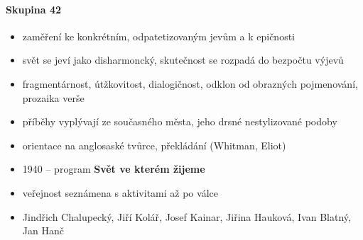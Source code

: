 \paragraph{Skupina 42}
\begin{itemize}
\item zaměření ke konkrétním, odpatetizovaným jevům a k epičnosti
\item svět se jeví jako disharmoncký, skutečnost se rozpadá do bezpočtu výjevů
\item fragmentárnost, útžkovitost, dialogičnost, odklon od obrazných pojmenování, prozaika verše
\item příběhy vyplývají ze současného města, jeho drsné nestylizované podoby
\item orientace na anglosaské tvůrce, překládání (Whitman, Eliot)
\item 1940 -- program \textbf{Svět ve kterém žijeme}
\item veřejnost seznámena s aktivitami až po válce
\item Jindřich Chalupecký, Jiří Kolář, Josef Kainar, Jiřina Hauková, Ivan Blatný, Jan Hanč
\end{itemize}

